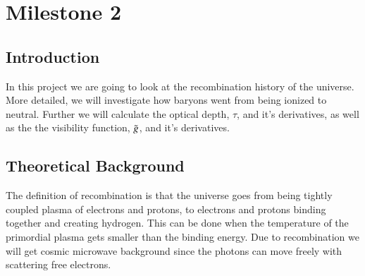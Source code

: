 \documentclass{aa}
\begin{document}
\section{Milestone 2}
\subsection{Introduction}
In this project we are going to look at the recombination history of the universe. More detailed, we will investigate how baryons went from being ionized to neutral. Further we will calculate the optical depth, $\tau$, and it's derivatives, as well as the the visibility function, $\Tilde{g}$, and it's derivatives. 
\subsection{Theoretical Background}
The definition of recombination is that the universe goes from being tightly coupled plasma of electrons and protons, to electrons and protons binding together and creating hydrogen. This can be done when the temperature of the primordial plasma gets smaller than the binding energy. Due to recombination we will get cosmic microwave background since the photons can move freely with scattering free electrons.
\end{document}
